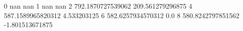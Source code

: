 0 nan nan
1 nan nan
2 792.1870727539062 209.561279296875
4 587.1589965820312 4.533203125
6 582.6257934570312 0.0
8 580.8242797851562 -1.801513671875
